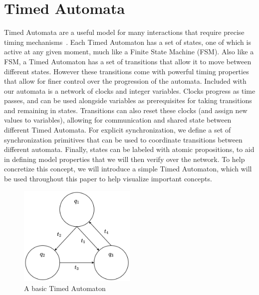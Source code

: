 \documentclass[a4paper,11pt]{report}
\theoremstyle{definition}
\begin{document}
\section{Timed Automata}\label{timed-automata}

Timed Automata are a useful model for many interactions that require precise
timing mechanisms~\cite{alur94}. Each Timed Automaton has a set of states, one
of which is active at any given moment, much like a Finite State Machine (FSM).
Also like a FSM, a Timed Automaton has a set of transitions that allow it to
move between different states. However these transitions come with powerful
timing properties that allow for finer control over the progression of the
automata. Included with our automata is a network of clocks and integer
variables. Clocks progress as time passes, and can be used alongside variables
as prerequisites for taking transitions and remaining in states. Transitions can
also reset these clocks (and assign new values to variables), allowing for
communication and shared state between different Timed Automata. For explicit
synchronization, we define a set of synchronization primitives that can be used
to coordinate transitions between different automata. Finally, states can be
labeled with atomic propositions, to aid in defining model properties that we
will then verify over the network. To help concretize this concept, we will
introduce a simple Timed Automaton, which will be used throughout this paper to
help visualize important concepts.

%    
\begin{figure}[h]
  \centering
  \includegraphics[width=0.5\textwidth]{minTA-blank}
  \caption{A basic Timed Automaton}
  \label{fig:example-blank}
\end{figure}
\end{document}

